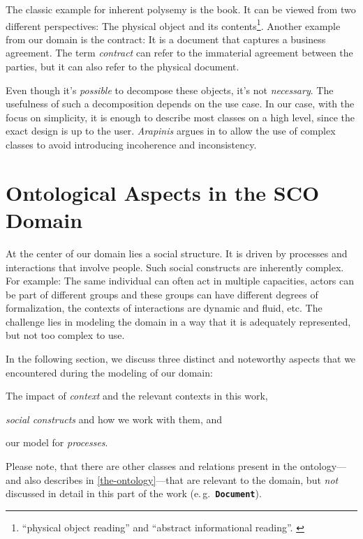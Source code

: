 \documentclass[a4paper, DIV=13, BCOR=0cm]{scrbook}
\newcommand{\eg}{e.\,g.\ }
\newcommand{\class}[1]{\texttt{\textbf{#1}}}
\begin{document}
The classic example for inherent polysemy is the book. It can be viewed from two different perspectives: The physical object and its contents\footnote{\enquote{physical object reading} and \enquote{abstract informational reading}. \cite[Section 2.1]{arapinis2015plea}}. Another example from our domain is the contract: It is a document that captures a business agreement. The term \textit{contract} can refer to the immaterial agreement between the parties, but it can also refer to the physical document.

Even though it's \textit{possible} to decompose these objects, it's not \textit{necessary}. The usefulness of such a decomposition depends on the use case. In our case, with the focus on simplicity, it is enough to describe most classes on a high level, since the exact design is up to the user. \textit{Arapinis} argues in \cite{arapinis2015plea} to allow the use of complex classes to avoid introducing incoherence and inconsistency.

\chapter{Ontological Aspects in the SCO Domain }
\label{domain-aspects}
At the center of our domain lies a social structure. It is driven by processes and interactions that involve people. Such social constructs are inherently complex. For example: The same individual can often act in multiple capacities, actors can be part of different groups and these groups can have different degrees of formalization, the contexts of interactions are dynamic and fluid, etc. The challenge lies in modeling the domain in a way that it is adequately represented, but not too complex to use.

In the following section, we discuss three distinct and noteworthy aspects that we encountered during the modeling of our domain:
\begin{inparablank}
	\item The impact of \textit{context} and the relevant contexts in this work,
	\item \textit{social constructs} and how we work with them, and
	\item our model for \textit{processes}.
\end{inparablank}

Please note, that there are other classes and relations present in the ontology---and also describes in \autoref{the-ontology}---that are relevant to the domain, but \textit{not} discussed in detail in this part of the work (\eg \class{Document}).
\end{document}
